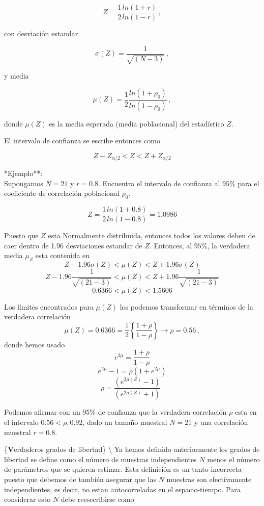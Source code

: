 \documentclass[
]{agujournal2019}
\begin{document}
\[Z=\frac{1}{2}\frac{ln(1+r)}{ln(1-r)}\,,\]

con desviación estandar

\[\sigma(Z)=\frac{1}{\sqrt{(N-3)}}\,,\]

y media

\[\mu(Z)=\frac{1}{2}\frac{ln(1+\rho_0)}{ln(1-\rho_0)}\,,\]

donde \(\mu(Z)\) es la media esperada (media poblacional) del
estadístico \(Z\).

El intervalo de confianza se escribe entonces como

\[Z-Z_{\alpha/2}<Z<Z+Z_{\alpha/2}\]

\vspace{0.5cm}

\noindent **Ejemplo**:\\
\noindent Supongamos \(N=21\) y \(r=0.8\). Encuentra el intervalo de
confianza al \(95\%\) para el coeficiente de correlación poblacional
\(\rho_0\).

\[Z=\frac{1}{2}\frac{ln(1+0.8)}{ln(1-0.8)}=1.0986\]

\noindent Puesto que \(Z\) esta Normalmente distribuida, entonces todos
los valores deben de caer dentro de 1.96 desviaciones estandar de \(Z\).
Entonces, al \(95\%\), la verdadera media \(\mu_Z\) esta contenida en
\[Z-1.96\sigma(Z) < \mu(Z) < Z + 1.96\sigma(Z)\]
\[Z-1.96\frac{1}{\sqrt{(21-3)}} < \mu(Z) < Z + 1.96\frac{1}{\sqrt{(21-3)}}\]
\[0.6366<\mu(Z)<1.5606\]

\noindent Los límites encontrados para \(\mu(Z)\) los podemos
transformar en términos de la verdadera correlación
\[\mu(Z)=0.6366=\frac{1}{2} \left\{ \frac{1+\rho}{1-\rho} \right\} \rightarrow  \rho=0.56\,,\]
donde hemos usado \[e^{2\mu}=\frac{1+\rho}{1-\rho}\]
\[e^{2\mu}-1=\rho(1+e^{2\mu})\]
\[\rho=\frac{(e^{2\mu(Z)}-1)}{(e^{2\mu(Z)}+1)}\,.\]

\noindent Podemos afirmar con un 95\% de confianza que la verdadera
correlación \(\rho\) esta en el intervalo \(0.56<\rho,0.92\), dado un
tamaño muestral \(N=21\) y una correlación muestral \(r=0.8\).

\vspace{0.5cm}

\{\noindent \textbf Verdaderos grados de libertad\} \textbackslash{}
\noindent Ya hemos definido anteriormente los grados de libertad se
define como el número de muestras independientes \(N\) menos el número
de parámetros que se quieren estimar. Esta definición es un tanto
incorrecta puesto que debemos de también asegurar que las \(N\) muestras
son efectivamente independientes, es decir, no estan autocorreladas en
el espacio-tiempo. Para considerar esto \(N\) debe reesecribirse como
\end{document}
